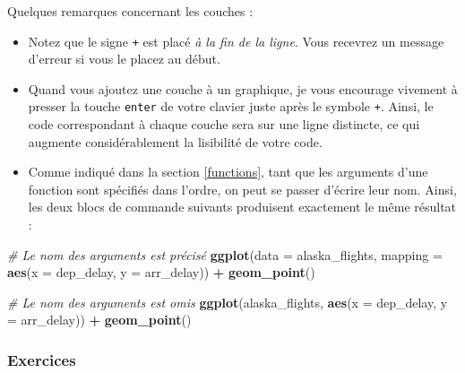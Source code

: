 \documentclass[a4paperpaper,]{article}
\newenvironment{Shaded}{\begin{snugshade}}{\end{snugshade}}
\newcommand{\KeywordTok}[1]{\textcolor[rgb]{0.13,0.29,0.53}{\textbf{#1}}}
\newcommand{\DataTypeTok}[1]{\textcolor[rgb]{0.13,0.29,0.53}{#1}}
\newcommand{\StringTok}[1]{\textcolor[rgb]{0.31,0.60,0.02}{#1}}
\newcommand{\CommentTok}[1]{\textcolor[rgb]{0.56,0.35,0.01}{\textit{#1}}}
\newcommand{\OperatorTok}[1]{\textcolor[rgb]{0.81,0.36,0.00}{\textbf{#1}}}
\newcommand{\NormalTok}[1]{#1}
\providecommand{\tightlist}{%
  \setlength{\itemsep}{0pt}\setlength{\parskip}{0pt}}
\theoremstyle{definition}
\theoremstyle{definition}
\theoremstyle{definition}
\theoremstyle{remark}
\begin{document}
Quelques remarques concernant les couches :

\begin{itemize}
\tightlist
\item
  Notez que le signe \texttt{+} est placé \emph{à la fin de la ligne}.
  Vous recevrez un message d'erreur si vous le placez au début.
\item
  Quand vous ajoutez une couche à un graphique, je vous encourage
  vivement à presser la touche \texttt{enter} de votre clavier juste
  après le symbole \texttt{+}. Ainsi, le code correspondant à chaque
  couche sera sur une ligne distincte, ce qui augmente considérablement
  la lisibilité de votre code.
\item
  Comme indiqué dans la section \ref{functions}, tant que les arguments
  d'une fonction sont spécifiés dans l'ordre, on peut se passer d'écrire
  leur nom. Ainsi, les deux blocs de commande suivants produisent
  exactement le même résultat :
\end{itemize}

\begin{Shaded}
\begin{Highlighting}[]
\CommentTok{# Le nom des arguments est précisé}
\KeywordTok{ggplot}\NormalTok{(}\DataTypeTok{data =}\NormalTok{ alaska_flights, }\DataTypeTok{mapping =} \KeywordTok{aes}\NormalTok{(}\DataTypeTok{x =}\NormalTok{ dep_delay, }\DataTypeTok{y =}\NormalTok{ arr_delay)) }\OperatorTok{+}\StringTok{ }
\StringTok{  }\KeywordTok{geom_point}\NormalTok{()}

\CommentTok{# Le nom des arguments est omis}
\KeywordTok{ggplot}\NormalTok{(alaska_flights, }\KeywordTok{aes}\NormalTok{(}\DataTypeTok{x =}\NormalTok{ dep_delay, }\DataTypeTok{y =}\NormalTok{ arr_delay)) }\OperatorTok{+}\StringTok{ }
\StringTok{  }\KeywordTok{geom_point}\NormalTok{()}
\end{Highlighting}
\end{Shaded}

\subsubsection{Exercices}\label{exercices-2}
\end{document}
